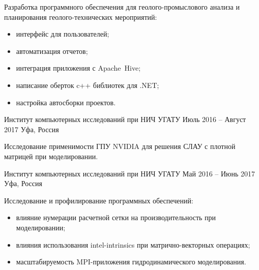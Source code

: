 \documentclass[10pt,a4paper,ragged2e,withhyper]{altacv}
\begin{document}
\begin{paracol}{2}
Разработка программного обеспечения для геолого-промыслового анализа и планирования геолого-технических мероприятий:

\begin{itemize}

  \item интерфейс для пользователей;
  \smallskip

  \item автоматизация отчетов;
  \smallskip

  \item интеграция приложения с Apache~Hive;
  \smallskip

  \item написание оберток c++ библиотек для .NET;
  \smallskip

  \item настройка автосборки проектов.

\end{itemize}

\divider

{Институт компьютерных исследований при НИЧ УГАТУ}
{Июль 2016 -- Август 2017}
{Уфа, Россия}

Исследование применимости ГПУ NVIDIA для решения СЛАУ с плотной матрицей при моделировании.

\divider

{Институт компьютерных исследований при НИЧ УГАТУ}
{Май 2016 -- Июнь 2017}
{Уфа, Россия}

Исследование и профилирование программных обеспечений:

\begin{itemize}

  \item влияние нумерации расчетной сетки на производительность при моделировании;
  \smallskip

  \item влияния использования intel-intrinsics при матрично-векторных операциях;
  \smallskip

  \item масштабируемость MPI-приложения гидродинамического моделирования.

\end{itemize}

\switchcolumn




\end{paracol}
\end{document}
